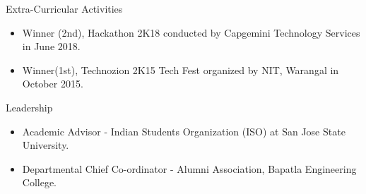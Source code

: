 \documentclass{resume} %
\begin{document}
\vspace{-0.5em}
\begin{rSection}{Extra-Curricular Activities} 
\begin{itemize}
\itemsep -6pt {} 
    \item 	Winner (2nd), Hackathon 2K18 conducted by Capgemini Technology Services in June 2018.
    \item	Winner(1st), Technozion 2K15 Tech Fest organized by NIT, Warangal in October 2015.
\end{itemize}
\end{rSection}

\vspace{-0.5em}
\begin{rSection}{Leadership} 
\begin{itemize}
\itemsep -6pt {} 
    \item Academic Advisor - Indian Students Organization (ISO) at San Jose State University.
      \item Departmental Chief Co-ordinator -  Alumni Association, Bapatla Engineering College.
\end{itemize}


\end{rSection}
\end{document}

